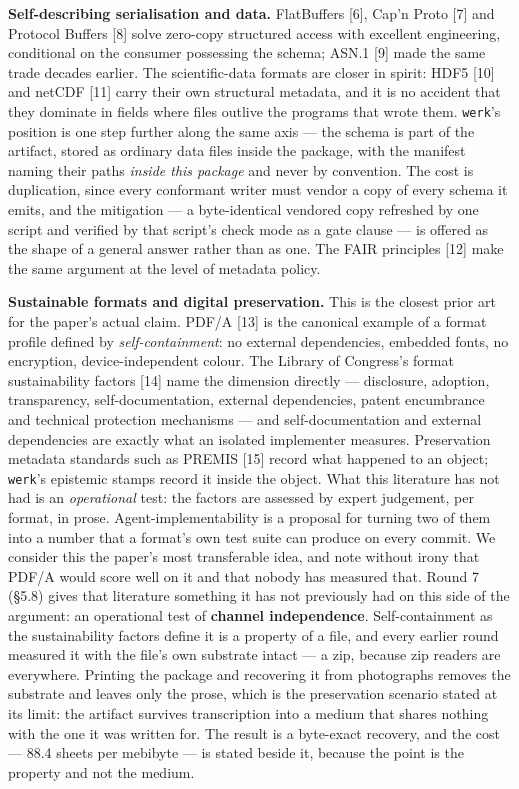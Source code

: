 \documentclass[10pt,twocolumn,letterpaper]{article}
\newcommand{\code}[1]{\texttt{\small #1}}
\begin{document}
\textbf{Self-describing serialisation and data.} FlatBuffers [6], Cap'n Proto [7] and Protocol Buffers [8] solve zero-copy structured access with excellent engineering, conditional on the consumer possessing the schema; ASN.1 [9] made the same trade decades earlier. The scientific-data formats are closer in spirit: HDF5 [10] and netCDF [11] carry their own structural metadata, and it is no accident that they dominate in fields where files outlive the programs that wrote them. \code{werk}'s position is one step further along the same axis --- the schema is part of the artifact, stored as ordinary data files inside the package, with the manifest naming their paths \emph{inside this package} and never by convention. The cost is duplication, since every conformant writer must vendor a copy of every schema it emits, and the mitigation --- a byte-identical vendored copy refreshed by one script and verified by that script's check mode as a gate clause --- is offered as the shape of a general answer rather than as one. The FAIR principles [12] make the same argument at the level of metadata policy.

\textbf{Sustainable formats and digital preservation.} This is the closest prior art for the paper's actual claim. PDF/A [13] is the canonical example of a format profile defined by \emph{self-containment}: no external dependencies, embedded fonts, no encryption, device-independent colour. The Library of Congress's format sustainability factors [14] name the dimension directly --- disclosure, adoption, transparency, self-documentation, external dependencies, patent encumbrance and technical protection mechanisms --- and self-documentation and external dependencies are exactly what an isolated implementer measures. Preservation metadata standards such as PREMIS [15] record what happened to an object; \code{werk}'s epistemic stamps record it inside the object. What this literature has not had is an \emph{operational} test: the factors are assessed by expert judgement, per format, in prose. Agent-implementability is a proposal for turning two of them into a number that a format's own test suite can produce on every commit. We consider this the paper's most transferable idea, and note without irony that PDF/A would score well on it and that nobody has measured that. Round 7 (\S5.8) gives that literature something it has not previously had on this side of the argument: an operational test of \textbf{channel independence}. Self-containment as the sustainability factors define it is a property of a file, and every earlier round measured it with the file's own substrate intact --- a zip, because zip readers are everywhere. Printing the package and recovering it from photographs removes the substrate and leaves only the prose, which is the preservation scenario stated at its limit: the artifact survives transcription into a medium that shares nothing with the one it was written for. The result is a byte-exact recovery, and the cost --- 88.4 sheets per mebibyte --- is stated beside it, because the point is the property and not the medium.
\end{document}
